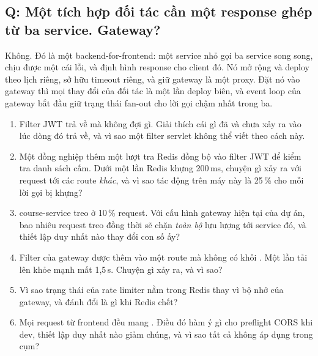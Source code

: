 \subsection*{Q: Một tích hợp đối tác cần một response ghép từ ba service. Gateway?}

Không. Đó là một backend-for-frontend: một service nhỏ gọi ba service
song song, chịu được một cái lỗi, và định hình response cho client đó.
Nó mở rộng và deploy theo lịch riêng, sở hữu timeout riêng, và giữ
gateway là một proxy. Đặt nó vào gateway thì mọi thay đổi của đối tác
là một lần deploy biên, và event loop của gateway bắt đầu giữ trạng
thái fan-out cho lời gọi chậm nhất trong ba.

\begin{quiz}
\begin{enumerate}
  \item Filter JWT trả về  mà không đợi
  gì. Giải thích cái gì đã và chưa xảy ra vào lúc dòng đó trả về, và vì
  sao một filter servlet không thể viết theo cách này.
  \item Một đồng nghiệp thêm một lượt tra Redis đồng bộ vào filter JWT
  để kiểm tra danh sách cấm. Dưới một lần Redis khựng 200\,ms, chuyện
  gì xảy ra với request tới các route \emph{khác}, và vì sao tác động
  trên máy này là 25\,\% cho mỗi lời gọi bị khựng?
  \item course-service treo ở 10\,\% request. Với cấu hình gateway hiện
  tại của dự án, bao nhiêu request treo đồng thời sẽ chặn \emph{toàn
  bộ} lưu lượng tới service đó, và thiết lập duy nhất nào thay đổi con
  số ấy?
  \item Filter  của gateway được thêm vào một
  route mà không có khối . Một lần tải lên khỏe mạnh
  mất 1,5\,s. Chuyện gì xảy ra, và vì sao?
  \item Vì sao trạng thái của rate limiter nằm trong Redis thay vì bộ
  nhớ của gateway, và đánh đổi là gì khi Redis chết?
  \item Mọi request từ frontend đều mang . Điều đó
  hàm ý gì cho preflight CORS khi dev, thiết lập duy nhất nào giảm
  chúng, và vì sao tất cả không áp dụng trong cụm?
\end{enumerate}
\end{quiz}
